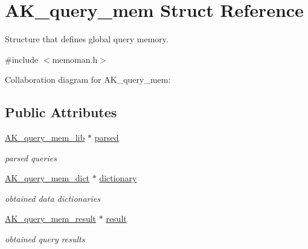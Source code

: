 \hypertarget{structAK__query__mem}{\section{A\+K\+\_\+query\+\_\+mem Struct Reference}
\label{structAK__query__mem}
}


Structure that defines global query memory.  




{\ttfamily \#include $<$memoman.\+h$>$}



Collaboration diagram for A\+K\+\_\+query\+\_\+mem\+:
\subsection*{Public Attributes}
\begin{DoxyCompactItemize}
\item 
\hypertarget{structAK__query__mem_a3b5ffb6f531f7f0a6821f3d643bd55db}{\hyperlink{structAK__query__mem__lib}{A\+K\+\_\+query\+\_\+mem\+\_\+lib} $\ast$ \hyperlink{structAK__query__mem_a3b5ffb6f531f7f0a6821f3d643bd55db}{parsed}}\label{structAK__query__mem_a3b5ffb6f531f7f0a6821f3d643bd55db}

\begin{DoxyCompactList}\small\item\em parsed queries \end{DoxyCompactList}\item 
\hypertarget{structAK__query__mem_ac75fcb9c9e74444239b7fa9862ce3ffe}{\hyperlink{structAK__query__mem__dict}{A\+K\+\_\+query\+\_\+mem\+\_\+dict} $\ast$ \hyperlink{structAK__query__mem_ac75fcb9c9e74444239b7fa9862ce3ffe}{dictionary}}\label{structAK__query__mem_ac75fcb9c9e74444239b7fa9862ce3ffe}

\begin{DoxyCompactList}\small\item\em obtained data dictionaries \end{DoxyCompactList}\item 
\hypertarget{structAK__query__mem_ac9e0f1fb8381c15b83051bb9f520d703}{\hyperlink{structAK__query__mem__result}{A\+K\+\_\+query\+\_\+mem\+\_\+result} $\ast$ \hyperlink{structAK__query__mem_ac9e0f1fb8381c15b83051bb9f520d703}{result}}\label{structAK__query__mem_ac9e0f1fb8381c15b83051bb9f520d703}

\begin{DoxyCompactList}\small\item\em obtained query results \end{DoxyCompactList}\end{DoxyCompactItemize}


